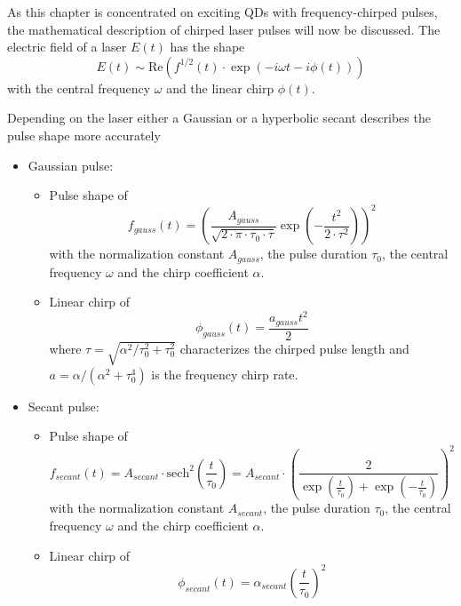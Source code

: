 As this chapter is concentrated on exciting \acp{QD} with frequency-chirped pulses, the mathematical description of chirped laser pulses will now be discussed. The electric field of a laser $E(t)$ has the shape
\begin{equation}
\label{eq:electric-field-laser}
E(t) \sim \mathrm{Re}\left(f^{1/2}(t) \cdot \exp\left(-i \omega t - i \phi(t)\right)\right)
\end{equation}
with the central frequency $\omega$ and the linear chirp $\phi(t)$.

Depending on the laser either a Gaussian or a hyperbolic secant describes the pulse shape more accurately~\cite{glassl_biexciton_2013, hirayama_real-time_2002}

\begin{itemize}
	\item Gaussian pulse:
	\begin{itemize}
		\item Pulse shape of
		\begin{equation}
		\label{eq:f_gauss}
		f_{gauss}(t) = \left(\frac{A_{gauss}}{\sqrt{2 \cdot \pi \cdot \tau_0 \cdot \tau}} \exp\left(-\frac{t^2}{2 \cdot \tau^2}\right)\right)^2
		\end{equation}
		with the normalization constant $A_{gauss}$, the pulse duration $\tau_0$, the central frequency $\omega$ and the chirp coefficient $\alpha$.
		\item Linear chirp of
		\begin{equation}
		\label{eq:phi-gauss}
		\phi_{gauss}(t) = \frac{a_{gauss} t^2}{2}
		\end{equation}
		where $\tau = \sqrt{\alpha^2 / \tau_0^2 + \tau_0^2}$ characterizes the chirped pulse length and $a = \alpha / (\alpha ^ 2 + \tau _0 ^ 4)$ is the frequency chirp rate.
	\end{itemize}
	\newpage
	\item Secant pulse:
	\begin{itemize}
		\item Pulse shape of
		\begin{equation}
		f_{secant}(t) = A_{secant} \cdot \textrm{sech}^2\left(\frac{t}{\tau_0}\right) = A_{secant} \cdot \left(\frac{2}{\exp(\frac{t}{\tau_0}) + \exp(-\frac{t}{\tau_0})}\right)^2
		\end{equation}
		with the normalization constant $A_{secant}$, the pulse duration $\tau_0$, the central frequency $\omega$ and the chirp coefficient $\alpha$.
		\item Linear chirp of
		\begin{equation}
		\phi_{secant}(t) = \alpha_{secant}\left(\frac{t}{\tau_0}\right)^2
		\end{equation}
	\end{itemize}
\end{itemize}

